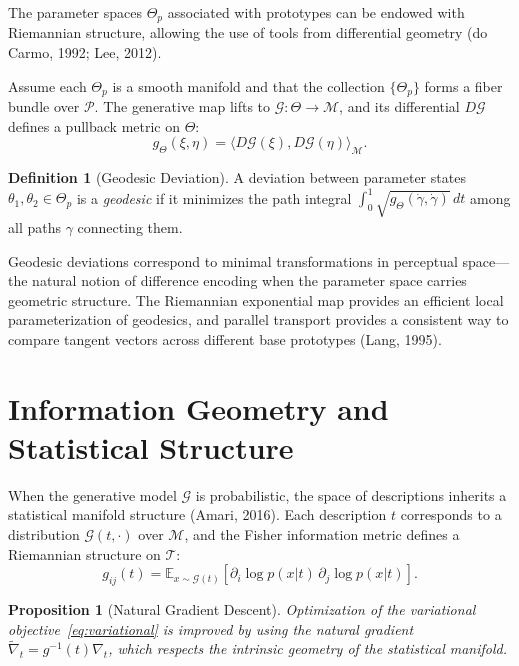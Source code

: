 \documentclass[11pt,a4paper]{article}
\newtheorem{proposition}[theorem]{Proposition}
\theoremstyle{definition}
\newtheorem{definition}[theorem]{Definition}
\theoremstyle{remark}
\begin{document}
The parameter spaces $\Theta_p$ associated with prototypes can be endowed with Riemannian structure, allowing the use of tools from differential geometry (do Carmo, 1992; Lee, 2012).

Assume each $\Theta_p$ is a smooth manifold and that the collection $\{\Theta_p\}$ forms a fiber bundle over $\mathcal{P}$. The generative map lifts to $\mathcal{G} : \Theta \to \mathcal{M}$, and its differential $D\mathcal{G}$ defines a pullback metric on $\Theta$:
\[
g_\Theta(\xi, \eta) = \langle D\mathcal{G}(\xi), D\mathcal{G}(\eta) \rangle_{\mathcal{M}}.
\]

\begin{definition}[Geodesic Deviation]
A deviation between parameter states $\theta_1, \theta_2 \in \Theta_p$ is a \emph{geodesic} if it minimizes the path integral $\int_0^1 \sqrt{g_\Theta(\dot{\gamma}, \dot{\gamma})} \, dt$ among all paths $\gamma$ connecting them.
\end{definition}

Geodesic deviations correspond to minimal transformations in perceptual space---the natural notion of difference encoding when the parameter space carries geometric structure. The Riemannian exponential map provides an efficient local parameterization of geodesics, and parallel transport provides a consistent way to compare tangent vectors across different base prototypes (Lang, 1995).

\section{Information Geometry and Statistical Structure}
\label{sec:infogeom}

When the generative model $\mathcal{G}$ is probabilistic, the space of descriptions inherits a statistical manifold structure (Amari, 2016). Each description $t$ corresponds to a distribution $\mathcal{G}(t, \cdot)$ over $\mathcal{M}$, and the Fisher information metric defines a Riemannian structure on $\mathcal{T}$:
\[
g_{ij}(t) = \mathbb{E}_{x \sim \mathcal{G}(t)} \left[ \partial_i \log p(x|t) \, \partial_j \log p(x|t) \right].
\]

\begin{proposition}[Natural Gradient Descent]
Optimization of the variational objective~\eqref{eq:variational} is improved by using the natural gradient $\tilde{\nabla}_t = g^{-1}(t) \nabla_t$, which respects the intrinsic geometry of the statistical manifold.
\end{proposition}
\end{document}
